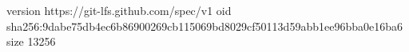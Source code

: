 version https://git-lfs.github.com/spec/v1
oid sha256:9dabe75db4ec6b86900269cb115069bd8029cf50113d59abb1ee96bba0e16ba6
size 13256
